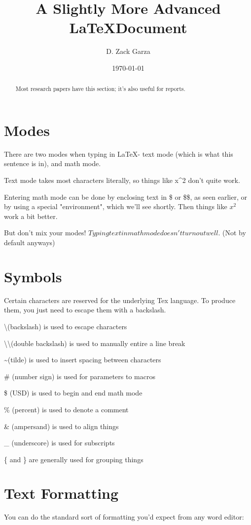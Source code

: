 \documentclass{article}
\author{D. Zack Garza}
\title{A Slightly More Advanced \LaTeX Document}
\date{\today}
\begin{document}
\maketitle
\newpage
\tableofcontents
\newpage

\begin{abstract}
    Most research papers have this section; it's also useful for reports.
\end{abstract}


\section{Modes}
    There are two modes when typing in \LaTeX - text mode (which is what this sentence is in), and math mode.
    
    Text mode takes most characters literally, so things like x^2 don't quite work.
    
    Entering math mode can be done by enclosing text in \$ or \$\$, as seen earlier, or by using a special "environment", which we'll see shortly. Then things like $x^2$ work a bit better.
    
    But don't mix your modes! $Typing text in math mode doesn't turn out well.$ (Not by default anyways)


\section{Symbols}
    Certain characters are reserved for the underlying Tex language. To produce them, you just need to escape them with a backslash.

    \textbackslash (backslash) is used to escape characters
    
    \textbackslash\textbackslash (double backslash) is used to manually entire a line break
    
    \textasciitilde (tilde) is used to insert spacing between characters
    
    \# (number sign) is used for parameters to macros
    
    \$ (USD) is used to begin and end math mode
    
    \% (percent) is used to denote a comment
    
    \& (ampersand) is used to align things
    
    \_ (underscore) is used for subscripts 
    
    \{ and \} are generally used for grouping things


\section{Text Formatting}
    You can do the standard sort of formatting you'd expect from any word editor:
    
\end{document}

